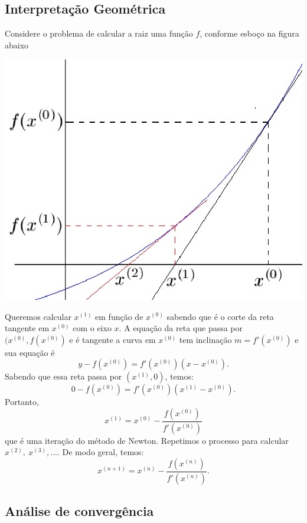 \subsection{Interpretação Geométrica}

Considere o problema de calcular a raiz uma função $f$, conforme esboço na figura abaixo

\begin{center}
\includegraphics[scale=.4]{./cap_equacao1d/pics/fig_Newton.eps}
\end{center}

Queremos calcular $x^{(1)}$ em função de $x^{(0)}$ sabendo que é o corte da reta tangente em $x^{(0)}$ com o eixo $x$. A equação da reta que passa por $(x^{(0)}, f(x^{(0)})$ e é tangente a curva em $x^{(0)}$ tem inclinação $m=f'(x^{(0)})$ e sua equação é
$$
y-f(x^{(0)})=f'(x^{(0)})(x-x^{(0)}).
$$
Sabendo que essa reta passa por $(x^{(1)},0)$, temos:
$$
0-f(x^{(0)})=f'(x^{(0)})(x^{(1)}-x^{(0)}).
$$
Portanto,
$$x^{(1)}=x^{(0)}-\frac{f(x^{(0)})}{f'(x^{(0)})}$$
que é uma iteração do método de Newton. Repetimos o processo para calcular $x^{(2)},\ x^{(3)},...$. De modo geral, temos:
$$x^{(n+1)}=x^{(n)}-\frac{f(x^{(n)})}{f'(x^{(n)})}.$$

\subsection{Análise de convergência}

